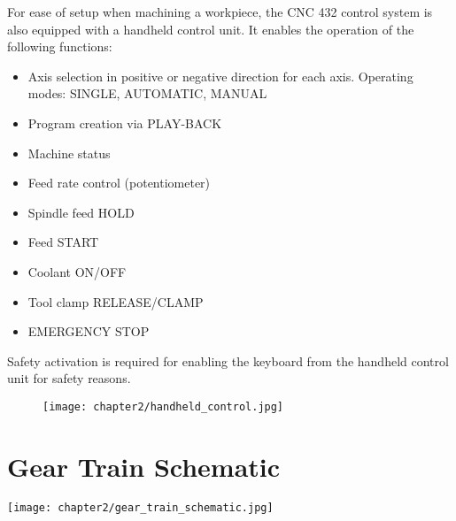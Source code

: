 \setcounter{page}{4}


For ease of setup when machining a workpiece, the CNC 432 control system is also equipped with a handheld control unit. It enables the operation of the following functions:

\begin{itemize}[itemsep=1pt,parsep=0pt]
    \item Axis selection in positive or negative direction for each axis. Operating modes: SINGLE, AUTOMATIC, MANUAL
    \item Program creation via PLAY-BACK
    \item Machine status
    \item Feed rate control (potentiometer)
    \item Spindle feed HOLD
    \item Feed START
    \item Coolant ON/OFF
    \item Tool clamp RELEASE/CLAMP
    \item EMERGENCY STOP
\end{itemize}

Safety activation is required for enabling the keyboard from the handheld control unit for safety reasons.

\vspace{0.3cm}


\vspace{0.3cm}


\vspace{-0.6cm}

\begin{center}
\end{center}

\vspace{-0.5cm}

\begin{figure}[h]
    \centering
    \texttt{[image: chapter2/handheld\_control.jpg]}
\end{figure}

\section{Gear Train Schematic}
\setcounter{section}{10}
\begin{minipage}{\textwidth}
    \begin{adjustwidth}{-2cm}{-3cm}
        \centering
        \texttt{[image: chapter2/gear\_train\_schematic.jpg]}
    \end{adjustwidth}
    \label{fig:gear_train}
\end{minipage}

